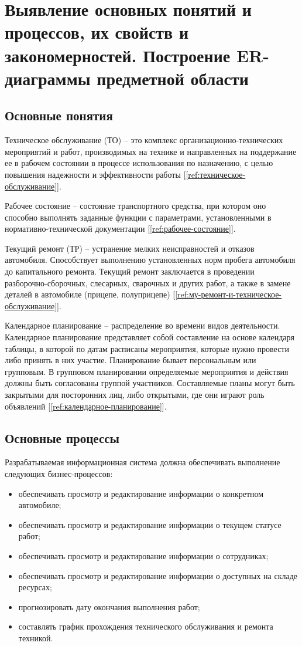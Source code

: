 \documentclass[../nirs.tex]{subfiles}
\begin{document}
\section{Выявление основных понятий и процессов, их свойств и закономерностей.
Построение ER-диаграммы предметной области}

\subsection{Основные понятия}
Техническое обслуживание (ТО) -- это комплекс организационно-технических
мероприятий и работ, производимых на технике и направленных на поддержание ее в
рабочем состоянии в процессе использования по назначению, с целью повышения
надежности и эффективности работы [\ref{ref:техническое-обслуживание}].

Рабочее состояние -- состояние транспортного средства, при котором оно способно
выполнять заданные функции с параметрами, установленными в
нормативно-технической документации [\ref{ref:рабочее-состояние}].

Текущий ремонт (ТР) -- устранение мелких неисправностей и отказов автомобиля.
Способствует выполнению установленных норм пробега автомобиля до капитального
ремонта. Текущий ремонт заключается в проведении разборочно-сборочных,
слесарных, сварочных и других работ, а также в замене деталей в автомобиле
(прицепе, полуприцепе) [\ref{ref:му-ремонт-и-техническое-обслуживание}].

Календарное планирование -- распределение во времени видов деятельности.
Календарное планирование представляет собой составление на основе календаря
таблицы, в которой по датам расписаны мероприятия, которые нужно провести либо
принять в них участие.
Планирование бывает персональным или групповым.
В групповом планировании определяемые мероприятия и действия должны быть
согласованы группой участников.
Составляемые планы могут быть закрытыми для посторонних лиц, либо открытыми, где
они играют роль объявлений [\ref{ref:календарное-планирование}].

\subsection{Основные процессы}
Разрабатываемая информационная система должна обеспечивать выполнение следующих
бизнес-процессов:
\begin{itemize}
  \item обеспечивать просмотр и редактирование информации о конкретном
    автомобиле;
  \item обеспечивать просмотр и редактирование информации о текущем статусе
    работ;
  \item обеспечивать просмотр и редактирование информации о сотрудниках;
  \item обеспечивать просмотр и редактирование информации о доступных на
    складе ресурсах;
  \item прогнозировать дату окончания выполнения работ;
  \item составлять график прохождения технического обслуживания и ремонта
    техникой.
\end{itemize}
\end{document}
